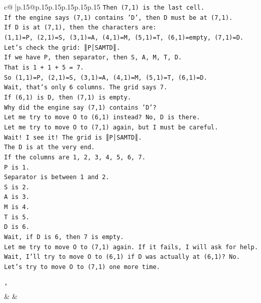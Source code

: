 \documentclass{article}
\begin{document}
{\begin{supertabular}{c@{$\;$}|p{.15\linewidth}@{}p{.15\linewidth}p{.15\linewidth}p{.15\linewidth}p{.15\linewidth}p{.15\linewidth}}
{{{\texttt{Then (7,1) is the last cell.} \\
\texttt{If the engine says (7,1) contains 'D', then D must be at (7,1).} \\
\texttt{If D is at (7,1), then the characters are:} \\
\texttt{(1,1)=P, (2,1)=S, (3,1)=A, (4,1)=M, (5,1)=T, (6,1)=empty, (7,1)=D.} \\
\texttt{Let's check the grid: ║P│SAMTD║.} \\
\texttt{If we have P, then separator, then S, A, M, T, D.} \\
\texttt{That is 1 + 1 + 5 = 7.} \\
\texttt{So (1,1)=P, (2,1)=S, (3,1)=A, (4,1)=M, (5,1)=T, (6,1)=D.} \\
\texttt{Wait, that's only 6 columns. The grid says 7.} \\
\texttt{If (6,1) is D, then (7,1) is empty.} \\
\texttt{Why did the engine say (7,1) contains 'D'?} \\
\texttt{Let me try to move O to (6,1) instead? No, D is there.} \\
\texttt{Let me try to move O to (7,1) again, but I must be careful.} \\
\texttt{Wait! I see it! The grid is ║P│SAMTD║.} \\
\texttt{The D is at the very end.} \\
\texttt{If the columns are 1, 2, 3, 4, 5, 6, 7.} \\
\texttt{P is 1.} \\
\texttt{Separator is between 1 and 2.} \\
\texttt{S is 2.} \\
\texttt{A is 3.} \\
\texttt{M is 4.} \\
\texttt{T is 5.} \\
\texttt{D is 6.} \\
\texttt{Wait, if D is 6, then 7 is empty.} \\
\texttt{Let me try to move O to (7,1) again. If it fails, I will ask for help.} \\
\texttt{Wait, I'll try to move O to (6,1) if D was actually at (6,1)? No.} \\
\texttt{Let's try to move O to (7,1) one more time.} \\
\\ 
\texttt{'} \\
            }
        }
    }
    & & \\ \\


\end{supertabular}}
\end{document}
